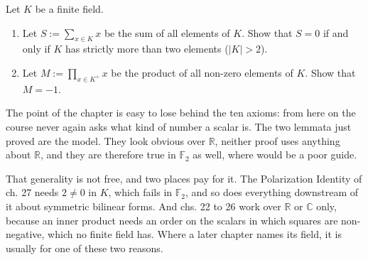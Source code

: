 \begin{exercise}
\label{exc:finite_field_sum_product}
Let $K$ be a finite field.
\begin{enumerate}
    \item Let $S := \sum_{x \in K} x$ be the sum of all elements of $K$. Show that $S = 0$ if and only if $K$ has strictly more than two elements ($|K| > 2$).
    \item Let $M := \prod_{x \in K^\times} x$ be the product of all non-zero elements of $K$. Show that $M = -1$.
\end{enumerate}
\end{exercise}

\begin{ainote}
The point of the chapter is easy to lose behind the ten axioms: from here on the
course never again asks what kind of number a scalar is. The two lemmata just
proved are the model. They look obvious over $\mathbb{R}$, neither proof uses
anything about $\mathbb{R}$, and they are therefore true in $\mathbb{F}_2$ as
well, where  would be a poor guide.

That generality is not free, and two places pay for it. The Polarization Identity
of ch. 27 needs $2 \neq 0$ in $K$, which fails in $\mathbb{F}_2$, and so does
everything downstream of it about symmetric bilinear forms. And chs. 22 to 26
work over $\mathbb{R}$ or $\mathbb{C}$ only, because an inner product needs an
order on the scalars in which squares are non-negative, which no finite field
has. Where a later chapter names its field, it is usually for one of these two
reasons.
\end{ainote}



